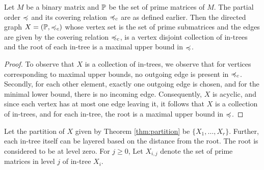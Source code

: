 \begin{theorem}%
  \label{thm:partition} %
  Let $M$ be a binary matrix and $\mathbb P$ be the set of prime matrices of
  $M$. The partial order $\preccurlyeq$ and its covering relation
  $\preccurlyeq_c$ are as defined earlier.
  Then the directed graph $X = (\mathbb P, \preccurlyeq_c)$ whose vertex
  set is the set of prime submatrices and the edges are given
  by the covering relation $\preccurlyeq_c$, is a vertex
  disjoint collection of in-trees and the root of each in-tree is a
  maximal upper bound in $\preccurlyeq$.
\end{theorem}
\begin{proof}\thesisspacing
  To observe that $X$ is a collection of in-trees, we observe that for
  vertices corresponding to maximal upper bounds, no outgoing edge is
  present in $\preccurlyeq_c$.  Secondly, for each other element, exactly one
  outgoing edge is chosen, and for the minimal lower bound, there is
  no incoming edge.  Consequently, $X$ is acyclic, and since each
  vertex has at most one edge leaving it, it follows that $X$ is a
  collection of in-trees, and for each in-tree, the root is a maximal
  upper bound in $\preccurlyeq$.  
\end{proof}
Let the partition of $X$ given by Theorem \ref{thm:partition} be
$\{X_1,\ldots,X_r\}$.  Further, each in-tree itself can be layered
based on the distance from the root.  The root is considered to be at
level zero. For $j \geq 0$, Let $X_{i,j}$ denote the set of prime
matrices in level $j$ of in-tree $X_i$.

